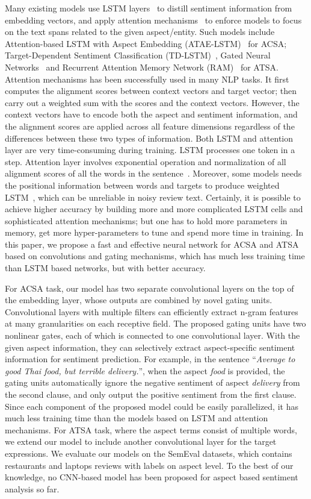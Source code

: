 \documentclass[11pt,a4paper]{article}
\begin{document}
Many existing models use LSTM layers~\cite{Hochreiter:1997fq} to distill sentiment information from embedding vectors, and apply attention mechanisms~\cite{Bahdanau:2014vz} to enforce models to focus on the text spans related to the given aspect/entity. Such models include Attention-based LSTM with Aspect Embedding (ATAE-LSTM)~\cite{Wang:2016tf} for ACSA; Target-Dependent Sentiment Classification (TD-LSTM)~\cite{Tang:2016th}, Gated Neural Networks~\cite{Zhang:2016th} and Recurrent Attention Memory Network (RAM)~\cite{Chen:2017wv} for ATSA.
Attention mechanisms has been successfully used in many NLP tasks. It first computes the alignment scores between context vectors and target vector; then carry out a weighted sum with the scores and the context vectors. 
However, the context vectors have to encode both the aspect and sentiment information, and the alignment scores are applied across all feature dimensions regardless of the differences between these two types of information.  
Both LSTM and attention layer are very time-consuming during training. LSTM processes one token in a step. Attention layer involves exponential operation and normalization of all alignment scores of all the words in the sentence~\cite{Wang:2016tf}. 
Moreover, some models needs the positional information between words and targets to produce weighted LSTM~\cite{Chen:2017wv}, which can be unreliable in noisy review text. 
Certainly, it is possible to achieve higher accuracy by building more and more complicated LSTM cells and sophisticated attention mechanisms; but one has to hold more parameters in memory, get more hyper-parameters to tune and spend more time in training.
In this paper, we propose a fast and effective neural network for ACSA and ATSA based on convolutions and gating mechanisms, which has much less training time than LSTM based networks, but with better accuracy.


For ACSA task, our model has two separate convolutional layers on the top of the embedding layer, whose outputs are combined by novel gating units. Convolutional layers with multiple filters can efficiently extract n-gram features at many granularities on each receptive field.
The proposed gating units have two nonlinear gates, each of which is connected to one convolutional layer. With the given aspect information, they can selectively extract aspect-specific sentiment information for sentiment prediction. 
For example, in the sentence ``\textit{Average to good Thai food, but terrible delivery.}'', when the aspect \textit{food} is provided, the gating units automatically ignore the negative sentiment of aspect \textit{delivery} from the second clause, and only output the positive sentiment from the first clause.
Since each component of the proposed model could be easily parallelized, it has much less training time than the models based on LSTM and attention mechanisms. 
For ATSA task, where the aspect terms consist of multiple words, we extend our model to include another convolutional layer for the target expressions. 
We evaluate our models on the SemEval datasets, which contains restaurants and laptops reviews with labels on aspect level. To the best of our knowledge, no CNN-based model has been proposed for aspect based sentiment analysis so far.
\end{document}

